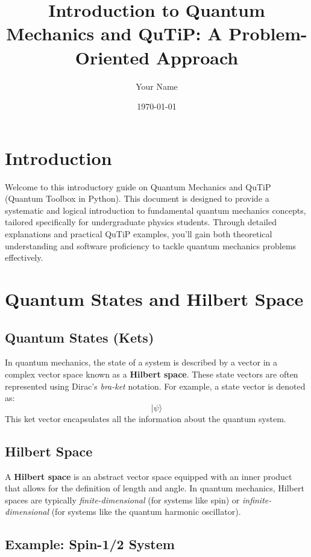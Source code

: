 \documentclass[12pt]{article}
\title{Introduction to Quantum Mechanics and QuTiP: A Problem-Oriented Approach}
\author{Your Name}
\date{\today}
\begin{document}
\maketitle

\tableofcontents

\newpage

\section{Introduction}

Welcome to this introductory guide on Quantum Mechanics and QuTiP (Quantum Toolbox in Python). This document is designed to provide a systematic and logical introduction to fundamental quantum mechanics concepts, tailored specifically for undergraduate physics students. Through detailed explanations and practical QuTiP examples, you'll gain both theoretical understanding and software proficiency to tackle quantum mechanics problems effectively.

\section{Quantum States and Hilbert Space}

\subsection{Quantum States (Kets)}

In quantum mechanics, the state of a system is described by a vector in a complex vector space known as a \textbf{Hilbert space}. These state vectors are often represented using Dirac's \textit{bra-ket} notation. For example, a state vector is denoted as:
\[
|\psi\rangle
\]
This ket vector encapsulates all the information about the quantum system.

\subsection{Hilbert Space}

A \textbf{Hilbert space} is an abstract vector space equipped with an inner product that allows for the definition of length and angle. In quantum mechanics, Hilbert spaces are typically \textit{finite-dimensional} (for systems like spin) or \textit{infinite-dimensional} (for systems like the quantum harmonic oscillator).

\subsection{Example: Spin-1/2 System}
\end{document}
